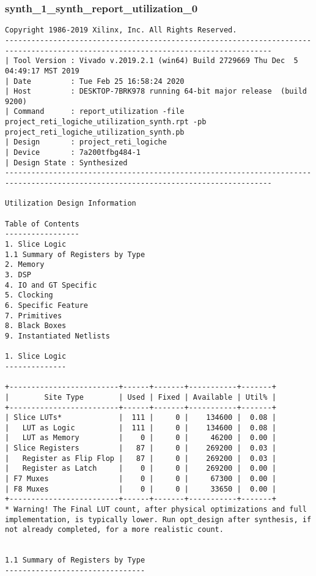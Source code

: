 \documentclass [a4paper, 12pt]{article}
\begin{document}
\subsubsection{synth\_1\_synth\_report\_utilization\_0}
\begin{lstlisting}[breaklines, basicstyle=\tiny]
Copyright 1986-2019 Xilinx, Inc. All Rights Reserved.
-----------------------------------------------------------------------------------------------------------------------------------
| Tool Version : Vivado v.2019.2.1 (win64) Build 2729669 Thu Dec  5 04:49:17 MST 2019
| Date         : Tue Feb 25 16:58:24 2020
| Host         : DESKTOP-7BRK978 running 64-bit major release  (build 9200)
| Command      : report_utilization -file project_reti_logiche_utilization_synth.rpt -pb project_reti_logiche_utilization_synth.pb
| Design       : project_reti_logiche
| Device       : 7a200tfbg484-1
| Design State : Synthesized
-----------------------------------------------------------------------------------------------------------------------------------

Utilization Design Information

Table of Contents
-----------------
1. Slice Logic
1.1 Summary of Registers by Type
2. Memory
3. DSP
4. IO and GT Specific
5. Clocking
6. Specific Feature
7. Primitives
8. Black Boxes
9. Instantiated Netlists

1. Slice Logic
--------------

+-------------------------+------+-------+-----------+-------+
|        Site Type        | Used | Fixed | Available | Util% |
+-------------------------+------+-------+-----------+-------+
| Slice LUTs*             |  111 |     0 |    134600 |  0.08 |
|   LUT as Logic          |  111 |     0 |    134600 |  0.08 |
|   LUT as Memory         |    0 |     0 |     46200 |  0.00 |
| Slice Registers         |   87 |     0 |    269200 |  0.03 |
|   Register as Flip Flop |   87 |     0 |    269200 |  0.03 |
|   Register as Latch     |    0 |     0 |    269200 |  0.00 |
| F7 Muxes                |    0 |     0 |     67300 |  0.00 |
| F8 Muxes                |    0 |     0 |     33650 |  0.00 |
+-------------------------+------+-------+-----------+-------+
* Warning! The Final LUT count, after physical optimizations and full implementation, is typically lower. Run opt_design after synthesis, if not already completed, for a more realistic count.


1.1 Summary of Registers by Type
--------------------------------


\end{lstlisting}
\end{document}
